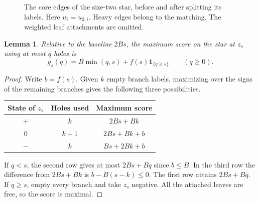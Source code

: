 \documentclass[11pt]{article}
\newtheorem{lemma}[theorem]{Lemma}
\theoremstyle{definition}\newtheorem{example}[theorem]{Example}
\newcommand{\ind}{\mathbf 1}
\begin{document}
\begin{figure}[ht]
\centering
{}
\caption{The core edges of the size-two star, before and after splitting its labels. Here $u_i=u_{2,i}$. Heavy edges belong to the matching. The weighted leaf attachments are omitted.}\label{fig:star}
\end{figure}

\begin{lemma}\label{lem:star}
Relative to the baseline $2Bs$, the maximum score on the star at $z_s$ using at most $q$ holes is
\begin{equation}\label{eq:gain}
 g_s(q)=B\min(q,s)+f(s)\ind_{\{q\ge s\}}\qquad(q\ge0).
\end{equation}
\end{lemma}
\begin{proof}
Write $b=f(s)$. Given $k$ empty branch labels, maximizing over the signs of the remaining branches gives the following three possibilities.
\begin{center}\begin{tabular}{ccc}\toprule
State of $z_s$ & Holes used & Maximum score \\ \midrule
$+$ & $k$ & $2Bs+Bk$ \\
$0$ & $k+1$ & $2Bs+Bk+b$ \\
$-$ & $k$ & $Bs+2Bk+b$ \\ \bottomrule
\end{tabular}\end{center}
If $q<s$, the second row gives at most $2Bs+Bq$ since $b\le B$. In the third row the difference from $2Bs+Bk$ is $b-B(s-k)\le0$. The first row attains $2Bs+Bq$. If $q\ge s$, empty every branch and take $z_s$ negative. All the attached leaves are free, so the score is maximal.\end{proof}
\end{document}
